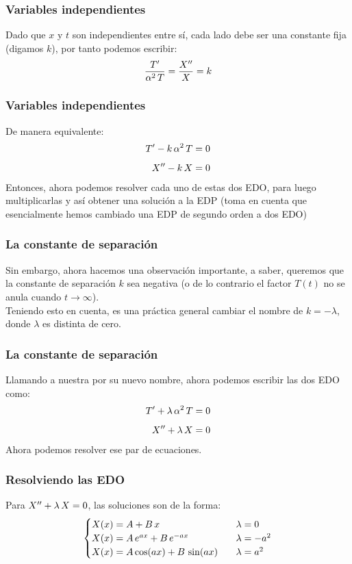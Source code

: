 \documentclass[12pt]{beamer}
\begin{document}
\begin{frame}
\frametitle{Variables independientes}
Dado que $x$ y $t$ son independientes entre sí, cada lado debe ser una constante fija (digamos $k$),  por tanto podemos escribir:
\pause
\begin{align*}
\dfrac{{T}^{\prime}}{\alpha^{2} \, T} = \dfrac{{X}^{\prime \prime}}{X} = k
\end{align*}
\end{frame}
\begin{frame}
\frametitle{Variables independientes}
De manera equivalente:
\pause
\begin{align*}
{T}^{\prime} - k \, \alpha^{2} \, T &= 0 \\[0.5em]
{X}^{\prime \prime} - k \, X &= 0
\end{align*}
\pause
Entonces, ahora podemos resolver cada uno de estas dos EDO, para luego multiplicarlas y así obtener una solución a la EDP (toma en cuenta que esencialmente hemos cambiado una EDP de segundo orden a dos EDO)
\end{frame}
\begin{frame}
\frametitle{La constante de separación}
Sin embargo, ahora hacemos una observación importante, a saber, queremos que la constante de separación $k$ sea negativa (o de lo contrario el factor $T (t)$ no se anula cuando $t \to \infty$).
\\
\bigskip
\pause
Teniendo esto en cuenta, es una práctica general cambiar el nombre de $k = - \lambda$, donde $\lambda$ es distinta de cero. 
\end{frame}
\begin{frame}
\frametitle{La constante de separación}
Llamando a nuestra  por su nuevo nombre, ahora podemos escribir las dos EDO como:
\begin{align*}
{T}^{\prime} + \lambda \, \alpha^{2} \, T &= 0 \\[0.5em]
{X}^{\prime \prime} + \lambda \, X &= 0
\end{align*}
\pause
Ahora podemos resolver ese par de ecuaciones.
\end{frame}
\begin{frame}
\frametitle{Resolviendo las EDO}
Para ${X}^{\prime \prime} + \lambda \, X = 0$, las soluciones son de la forma:
\pause
\begin{align}
\begin{cases}
X (x) = A + B \, x & \hspace{0.2cm} \lambda = 0 \\
X (x) = A \, e^{a x} + B \, e^{-a x} & \hspace{0.2cm} \lambda = - a^{2} \\
X (x) = A \cos (a x ) + B \, \sin (a x) & \hspace{0.2cm} \lambda = a^{2}
\end{cases}
\label{eq:ecuacion_06_02_31}
\end{align}
\end{frame}
\end{document}
